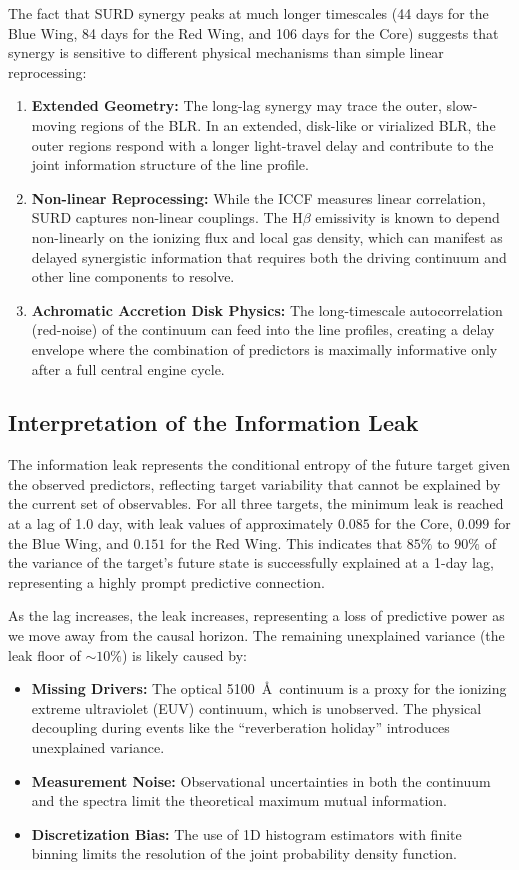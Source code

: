 \documentclass[12pt, a4paper]{article}
\begin{document}
The fact that SURD synergy peaks at much longer timescales (44 days for the Blue Wing, 84 days for the Red Wing, and 106 days for the Core) suggests that synergy is sensitive to different physical mechanisms than simple linear reprocessing:
\begin{enumerate}
    \item \textbf{Extended Geometry:} The long-lag synergy may trace the outer, slow-moving regions of the BLR. In an extended, disk-like or virialized BLR, the outer regions respond with a longer light-travel delay and contribute to the joint information structure of the line profile.
    \item \textbf{Non-linear Reprocessing:} While the ICCF measures linear correlation, SURD captures non-linear couplings. The H\(\beta\) emissivity is known to depend non-linearly on the ionizing flux and local gas density, which can manifest as delayed synergistic information that requires both the driving continuum and other line components to resolve.
    \item \textbf{Achromatic Accretion Disk Physics:} The long-timescale autocorrelation (red-noise) of the continuum can feed into the line profiles, creating a delay envelope where the combination of predictors is maximally informative only after a full central engine cycle.
\end{enumerate}

\subsection{Interpretation of the Information Leak}

The information leak represents the conditional entropy of the future target given the observed predictors, reflecting target variability that cannot be explained by the current set of observables.
For all three targets, the minimum leak is reached at a lag of 1.0 day, with leak values of approximately $0.085$ for the Core, $0.099$ for the Blue Wing, and $0.151$ for the Red Wing. This indicates that $85\%$ to $90\%$ of the variance of the target's future state is successfully explained at a 1-day lag, representing a highly prompt predictive connection.

As the lag increases, the leak increases, representing a loss of predictive power as we move away from the causal horizon. The remaining unexplained variance (the leak floor of $\sim 10\%$) is likely caused by:
\begin{itemize}
    \item \textbf{Missing Drivers:} The optical 5100~\AA\ continuum is a proxy for the ionizing extreme ultraviolet (EUV) continuum, which is unobserved. The physical decoupling during events like the ``reverberation holiday'' introduces unexplained variance.
    \item \textbf{Measurement Noise:} Observational uncertainties in both the continuum and the spectra limit the theoretical maximum mutual information.
    \item \textbf{Discretization Bias:} The use of 1D histogram estimators with finite binning limits the resolution of the joint probability density function.
\end{itemize}
\end{document}
